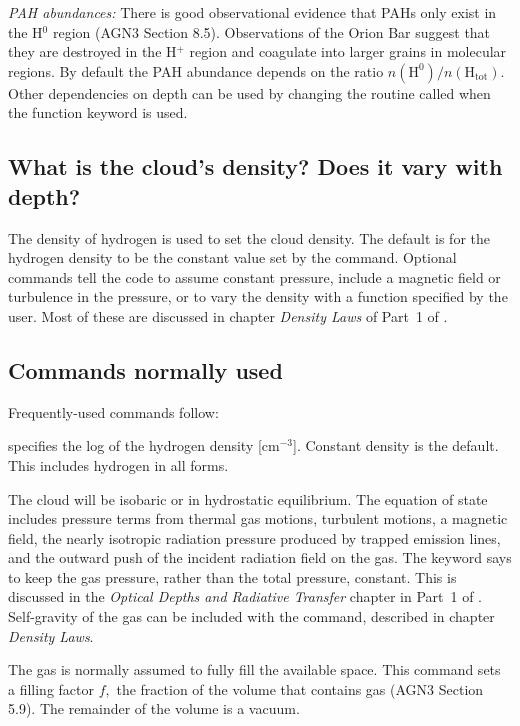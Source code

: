 \documentclass[12pt,twoside]{article}
\begin{document}
\emph{PAH abundances:} There is good observational
evidence that PAHs only exist
in the H$^0$ region (AGN3 Section 8.5).  Observations of the Orion Bar suggest
that they are destroyed in the H$^+$ region and coagulate into larger grains
in molecular regions.  By default the PAH abundance depends on the ratio
$n(\mathrm{H}^0)/n(\mathrm{H}_\mathrm{tot})$.  Other
dependencies on depth can be used by changing the
routine called when the function keyword is used.

\subsection{What is the cloud's density?  Does it vary with depth?}

The density of hydrogen is used to set the cloud density.  The default
is for the hydrogen density to be the constant value set by the
 command.
Optional commands tell the code to assume constant pressure, include a
magnetic field or turbulence in the pressure, or to vary the density with
a function specified by the user.  Most of these are discussed in chapter
\emph{Density Laws} of Part~1 of \Hazy.

\subsection{Commands normally used}

Frequently-used commands follow:

 specifies the log of the
\label{command:hden}
hydrogen density [cm$^{-3}$].  Constant density
is the default.  This includes hydrogen in all forms.

\quad The cloud will be isobaric or
\label{command:ConstantPressure}
in hydrostatic equilibrium.  The equation
of state includes pressure terms from thermal gas motions, turbulent motions,
a magnetic field, the nearly isotropic radiation pressure produced by trapped
emission lines, and the outward push of the incident radiation field on
the gas.  The keyword  says to
keep the gas pressure, rather than the
total pressure, constant.
This is discussed in the
\emph{Optical Depths and Radiative Transfer} chapter in Part~1 of \Hazy.
Self-gravity of the gas can be included with the  command, described in chapter \emph{Density Laws}.

\quad  The gas is
\label{command:FillingFactor}
normally assumed to fully fill the available
space.  This command sets a filling factor $f,$ the fraction of the volume
that contains gas (AGN3 Section 5.9).  The remainder of the volume is a
vacuum.
\end{document}
